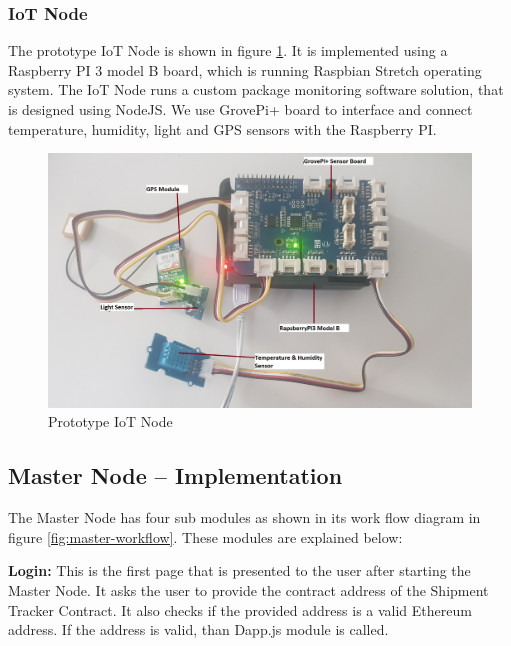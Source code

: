 \subsubsection{IoT Node}
The prototype IoT Node is shown in figure \ref{fig:piIoT}. It is implemented using a Raspberry PI 3 model B board, which is running Raspbian Stretch operating system. The IoT Node runs a custom package monitoring software solution, that is designed using NodeJS. We use GrovePi+ board to interface and connect temperature, humidity, light and GPS sensors with the Raspberry PI.

\begin{figure}[h]
	\centering
    \includegraphics[width=140mm,scale=1]{figs/piIoT}
	\caption{Prototype IoT Node}
	\label{fig:piIoT} 
\end{figure}
\clearpage


\subsection{Master Node – Implementation} \label{IMN} 
The Master Node has four sub modules as shown in its work flow diagram in figure \ref{fig:master-workflow}. These modules are explained below:

\textbf{Login:}
This is the first page that is presented to the user after starting the Master Node. It asks the user to provide the contract address of the Shipment Tracker Contract. It also checks if the provided address is a valid Ethereum address. If the address is valid, than Dapp.js module is called.

